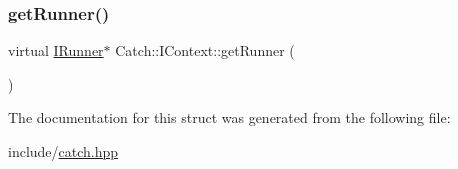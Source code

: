 \mbox{\label{struct_catch_1_1_i_context_af088415dde18d039ed5a2f95b02767c6}} 
\subsubsection{\texorpdfstring{getRunner()}{getRunner()}}
{\footnotesize\ttfamily virtual \mbox{\hyperlink{struct_catch_1_1_i_runner}{I\+Runner}}$\ast$ Catch\+::\+I\+Context\+::get\+Runner (\begin{DoxyParamCaption}{ }\end{DoxyParamCaption})\hspace{0.3cm}{\ttfamily [pure virtual]}}



The documentation for this struct was generated from the following file\+:\begin{DoxyCompactItemize}
\item 
include/\mbox{\hyperlink{catch_8hpp}{catch.\+hpp}}\end{DoxyCompactItemize}
